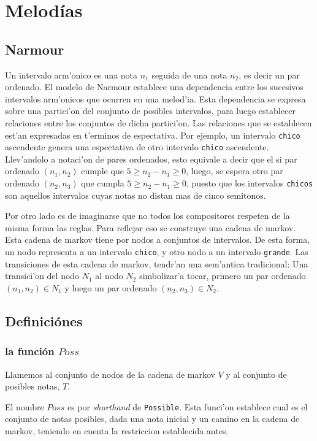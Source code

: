 
\section{Melod\'ias}
\subsection{Narmour}
Un intervalo arm'onico es una nota $n_1$ seguida de una nota $n_2$, es decir un par ordenado.
El modelo de Narmour establece una dependencia entre los sucesivos intervalos arm'onicos que ocurren en una melod'ia.
Esta dependencia se expresa sobre una partici'on del conjunto de posibles intervalos, para luego establecer relaciones entre los conjuntos de dicha partici'on.
Las relaciones que se establecen est'an expresadas en t'erminos de espectativa. Por ejemplo, un intervalo \texttt{chico} ascendente genera una espectativa de otro 
intervalo \texttt{chico} ascendente. Llev'andolo a notaci'on de pares ordenados, esto equivale a decir que el si par ordenado $(n_1, n_2)$ 
cumple que $5 \geq n_2 - n_1 \geq 0$, luego, se espera otro par ordenado $(n_2, n_3)$ que cumpla $5\geq n_2 - n_1 \geq 0$, 
puesto que los intervalos \texttt{chicos} son aquellos intervalos cuyas notas no distan mas de cinco semitonos.

Por otro lado es de imaginarse que no todos los compositores respeten de la misma forma las reglas. Para reflejar eso se construye una cadena de markov.
Esta cadena de markov tiene por nodos a conjuntos de intervalos. De esta forma, un nodo representa a un intervalo \texttt{chico}, y otro nodo a un intervalo 
\texttt{grande}. Las transiciones de esta cadena de markov, tendr'an una sem'antica tradicional: Una transici'on del nodo $N_1$ al nodo $N_2$ simbolizar'a tocar, 
primero un par ordenado $(n_1, n_2) \in N_1$ y luego un par ordenado $(n_2, n_3) \in N_2$.


\subsection{Definici\'ones}
\subsubsection{la funci\'on $Poss$}
Llamemos al conjunto de nodos de la cadena de markov $V$ y al conjunto de posibles notas, $T$.

El nombre $Poss$ es por \emph{shorthand} de \texttt{Possible}. Esta funci'on establece cual es el conjunto de notas posibles, dada una nota inicial y 
un camino en la cadena de markov, teniendo en cuenta la restriccion establecida antes.

